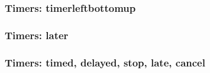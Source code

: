 \documentclass{article}
\begin{document}
{
\begin{chrono}[]
\testx
\end{chrono}
\hfill
\begin{chrono}[]
\testxi
\end{chrono}

\begin{hchrono}
\testx
\end{hchrono}

\bigskip

\begin{hchrono}
\testxi
\end{hchrono}
}

\subsubsection*{Timers: timerleftbottomup}

{
\begin{chrono}[]
\testx
\end{chrono}
\hfill
\begin{chrono}[]
\testxi
\end{chrono}

\begin{hchrono}
\testx
\end{hchrono}

\bigskip

\begin{hchrono}
\testxi
\end{hchrono}
}
\vfill

\subsubsection*{Timers: later}

\begin{chrono}
  \testlater
\end{chrono}
\begin{chrono}[timerleftbelow]
  \testlater
\end{chrono}
\begin{chrono}[timerleftbottomup]
  \testlater
\end{chrono}
\begin{chrono}
  \testlateri
\end{chrono}


\subsubsection*{Timers: timed, delayed, stop, late, cancel}
\end{document}
